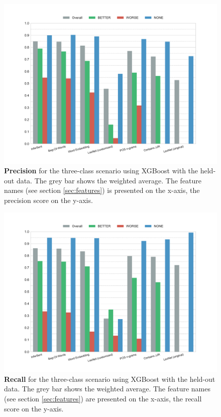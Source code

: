 \begin{figure}[htbp]
         \caption{\textbf{Precision} for the three-class scenario using XGBoost with the held-out data. The grey bar shows the weighted average. The feature names (see section \ref{sec:features}) is presented on the x-axis, the precision score on the y-axis.} 
    \label{fig:h_3_prec}
    \centering
	\includegraphics[width=0.9\linewidth]{images/heldout/h-precision-False}
    \end{figure}
    
    \begin{figure}[htbp]
              \caption{\textbf{Recall} for the three-class scenario using XGBoost with the held-out data. The grey bar shows the weighted average. The feature names (see section \ref{sec:features}) are presented on the x-axis, the recall score on the y-axis.} 
       \label{fig:h_3_rec}
 \centering
	\includegraphics[width=0.9\linewidth]{images/heldout/h-recall-False}

\end{figure}

